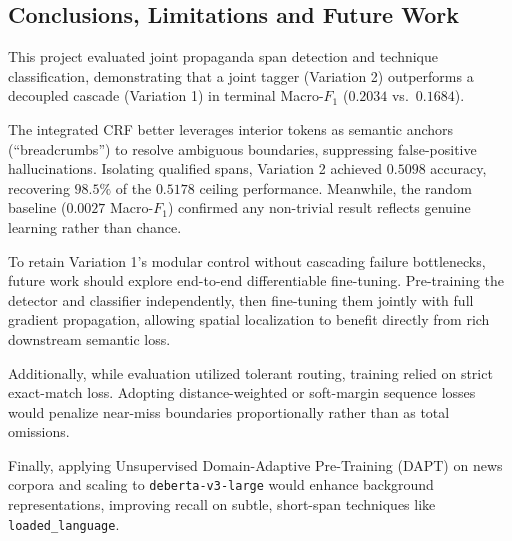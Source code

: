 \documentclass[12pt, a4paper]{article}
\begin{document}
\subsection{Conclusions, Limitations and Future Work}
\label{subsec:task2_conclusions}

This project evaluated joint propaganda span detection and technique classification, demonstrating that a joint tagger (Variation 2) outperforms a decoupled cascade (Variation 1) in terminal Macro-$F_1$ ($0.2034$ vs.\ $0.1684$). 

The integrated CRF better leverages interior tokens as semantic anchors (``breadcrumbs'') to resolve ambiguous boundaries, suppressing false-positive hallucinations. Isolating qualified spans, Variation 2 achieved $0.5098$ accuracy, recovering $98.5\%$ of the $0.5178$ ceiling performance. Meanwhile, the random baseline ($0.0027$ Macro-$F_1$) confirmed any non-trivial result reflects genuine learning rather than chance.

To retain Variation 1's modular control without cascading failure bottlenecks, future work should explore end-to-end differentiable fine-tuning. Pre-training the detector and classifier independently, then fine-tuning them jointly with full gradient propagation, allowing spatial localization to benefit directly from rich downstream semantic loss.

Additionally, while evaluation utilized tolerant routing, training relied on strict exact-match loss. Adopting distance-weighted or soft-margin sequence losses would penalize near-miss boundaries proportionally rather than as total omissions.

Finally, applying Unsupervised Domain-Adaptive Pre-Training (DAPT) on news corpora and scaling to \texttt{deberta-v3-large} would enhance background representations, improving recall on subtle, short-span techniques like \texttt{loaded\_language}.

\end{document}

